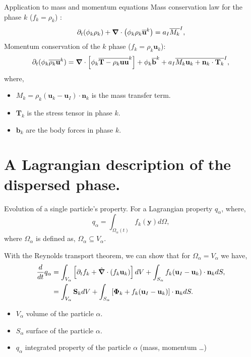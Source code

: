 \documentclass{sintefbeamer}
\newcommand{\nablab}{\bm{\nabla}}
\newcommand{\nablabh}{\hat{\bm{\nabla}}}
\begin{document}
\begin{frame}
  {Application to mass and momentum equations}
  Mass conservation law for the phase $k$ ($f_k = \rho_k$) :
  \begin{equation}
    \pddt (\phi_k \rho_k)
    + \nablab \cdot \left(\phi_k \rho_k 
        \kavg{\textbf{u}}
    \right) 
    = a_I\Iavg{M_k},
    \label{eq:avg_k_mass}
\end{equation}
  Momentum conservation of the $k$ phase ($f_k = \rho_k \textbf{u}_k$): 
  \begin{equation}
    \pddt (\phi_k\kavg{\rho_k\textbf{u}}) 
    = \nablab\cdot\left[
        \phi_k \kavg{\textbf{T}
        - \rho_k \textbf{uu}}
    \right]
    +\phi_k\kavg{\textbf{b}}
    + a_I\Iavg{M_k \textbf{u}_k +\textbf{n}_k\cdot\textbf{T}_k},
\end{equation}
where, 
\begin{itemize}
  \item $M_k = \rho_k (\textbf{u}_k-\textbf{u}_I) \cdot \textbf{n}_k$ is the mass transfer term.
  \item $\textbf{T}_k$ is the stress tensor in phase $k$.
  \item $\textbf{b}_k$ are the body forces in phase $k$. 
\end{itemize}
\end{frame}

\section{A Lagrangian description of the dispersed phase.}

\begin{frame}{Evolution of a single particle's property.}
  For a Lagrangian property $q_\alpha$, where,
  \begin{equation}
    q_\alpha
    = \int_{\Omega_\alpha(t)} f_k(\textbf{y}) d\Omega,
    \label{eq:q_alpha}
\end{equation}
where $\Omega_\alpha$ is defined as, $\Omega_\alpha \subseteq  V_\alpha$.

With the Reynolds transport theorem, we can show that for $\Omega_\alpha = V_\alpha$ we have, 
\begin{align*}
  \ddt  q_\alpha 
  &= \int_{V_\alpha}\left[ \pddt f_k + \nablabh \cdot\left(f_k\textbf{u}_k\right) \right]dV 
    + \int_{S_\alpha} f_k (\textbf{u}_I-\textbf{u}_k)\cdot \textbf{n}_k d S,\\
  &= \int_{V_\alpha} \textbf{S}_k dV 
  + \int_{S_\alpha} \left[\bm{\Phi}_k + f_k (\textbf{u}_I-\textbf{u}_k) \right] \cdot \textbf{n}_k d S.
\end{align*}
\begin{itemize}
  \item $V_\alpha$ volume of the particle $\alpha$.
  \item $S_\alpha$ surface of the particle $\alpha$.
  \item $q_\alpha$ integrated property of the particle $\alpha$ (mass, momentum \ldots)
\end{itemize}
\end{frame}
\end{document}
